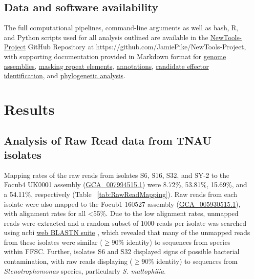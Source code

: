 \subsection{Data and software availability}

The full computational pipelines, command-line arguments as well as bash, R, and Python scripts used for all analysis outlined are available in the \href{https://github.com/JamiePike/NewTools-Project}{NewTools-Project} GitHub Repository at https://github.com/JamiePike/NewTools-Project, with supporting documentation provided in Markdown format for \href{https://github.com/JamiePike/NewTools-Project/blob/master/docs/Assembly/AssemblyNotes.md}{genome assemblies}, \href{https://github.com/JamiePike/NewTools-Project/blob/master/docs/Annotations/RepeatMaskingNotes.md}{masking repeat elements}, \href{https://github.com/JamiePike/NewTools-Project/blob/master/docs/Annotations/Annotations.md}{annotations}, \href{https://github.com/JamiePike/NewTools-Project/blob/master/docs/Effectors/PredicitionofCandidateEffectors.md}{candidate effector identification}, and \href{https://github.com/JamiePike/NewTools-Project/blob/master/docs/Phylogeny/Phylogenies.md}{phylogenetic analysis}.

\newpage
\section{Results}

\subsection{Analysis of Raw Read data from TNAU isolates}

Mapping rates of the raw reads from isolates S6, S16, S32, and SY-2 to the \ac{Focub4} UK0001 assembly (\href{https://www.ncbi.nlm.nih.gov/datasets/genome/GCA_007994515.1/}{GCA\_007994515.1}) were 8.72\%, 53.81\%, 15.69\%, and a 54.11\%, respectively (Table ~\ref{tab:RawReadMapping}). Raw reads from each isolate were also mapped to the \ac{Focub1} 160527 assembly (\href{https://www.ncbi.nlm.nih.gov/datasets/genome/GCA_005930515.1/}{GCA\_005930515.1}), with alignment rates for all \textless 55\%. Due to the low alignment rates, unmapped reads were extracted and a random subset of 1000 reads per isolate was searched using \ac{ncbi} \href{https://blast.ncbi.nlm.nih.gov/Blast.cgi?PROGRAM=blastn&BLAST_SPEC=GeoBlast&PAGE_TYPE=BlastSearch}{web BLASTN suite} \parencite{Nih2014}, which revealed that many of the unmapped reads from these isolates were similar ($\geq90\% $ identity) to sequences from species within \ac{FFSC}. Further, isolates S6 and S32 displayed signs of possible bacterial contamination, with raw reads displaying ($ \geq90\% $ identity) to sequences from \textit{Stenotrophomonas} species, particularly \textit{S. maltophilia}. 

